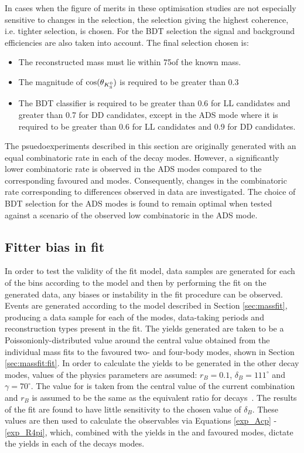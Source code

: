 In cases when the figure of merits in these optimisation studies are not especially sensitive to changes in the selection, the selection giving the highest coherence, i.e. tighter \Kstarm selection, is chosen. For the BDT selection the signal and background efficiencies are also taken into account. The final selection chosen is:

\begin{itemize}
\item{The reconstructed \Kstarm mass must lie within 75\mev of the known \Kstarm mass.}
\item{The magnitude of $\cos(\theta_{{{K}^0_{\mathrm{ \scriptscriptstyle S}}}})$ is required to be greater than 0.3}
\item{The BDT classifier is required to be greater than 0.6 for LL candidates and greater than 0.7 for DD candidates, except in the ADS mode where it is required to be greater than 0.6 for LL candidates and 0.9 for DD candidates.}
\end{itemize}

The psuedoexperiments described in this section are originally generated with an equal combinatoric rate in each of the \Dz decay modes. However, a significantly lower combinatoric rate is observed in the ADS modes compared to the corresponding favoured \kpi and \kpipipi modes. Consequently, changes in the combinatoric rate corresponding to differences observed in data are investigated. The choice of BDT selection for the ADS modes is found to remain optimal when tested against a scenario of the observed low combinatoric in the ADS mode. 

\subsection{Fitter bias in \CP fit}
\label{sec:cpfit:fitterbias}

In order to test the validity of the \CP fit model, data samples are generated for each of the bins according to the model and then by performing the \CP fit on the generated data, any biases or instability in the \CP fit procedure can be observed. Events are generated according to the model described in Section \ref{sec:massfit}, producing a data sample for each of the \Dz modes, data-taking periods and \KS reconstruction types present in the \CP fit. The yields generated are taken to be a Poissonionly-distributed value around the central value obtained from the individual mass fits to the favoured two- and four-body modes, shown in Section \ref{sec:massfit:fit}. In order to calculate the yields to be generated in the other \Dz decay modes, values of the physics parameters are assumed: $r_B = 0.1$, $\delta_B = 111^{\circ}$ and $\gamma = 70^{\circ}$. The value for \Pgamma is taken from the central value of the current \lhcb combination and $r_B$ is assumed to be the same as the equivalent ratio for \decay{\Bm}{\D\Km} decays~\cite{LHCb-PAPER-2016-032}. The results of the fit are found to have little sensitivity to the chosen value of $\delta_B$. These values are then used to calculate the \CP observables via Equations \ref{exp_Acp} - \ref{exp_R4pi}, which, combined with the yields in the \kpi and \kpipipi favoured modes, dictate the yields in each of the \Dz decays modes. 


